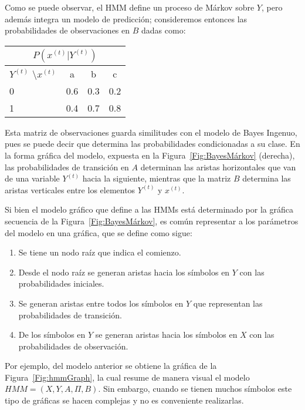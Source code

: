 Como se puede observar, el HMM define un proceso de Márkov sobre $Y$, pero además integra un modelo de predicción; consideremos entonces las probabilidades de observaciones en $B$ dadas como:

\begin{center}
 \begin{tabular}{l|ccc}
  \multicolumn{4}{c}{$P(x^{(t)}|Y^{(t)})$} \\ \hline
  $Y^{(t)}$ \textbackslash $x^{(t)}$          & a & b & c \\ \hline
  0 &    0.6   &    0.3  & 0.2 \\
  1   &    0.4   &    0.7  & 0.8 
 \end{tabular}
 \end{center}

 Esta matriz de observaciones guarda similitudes con el modelo de Bayes Ingenuo, pues se puede decir que determina las probabilidades condicionadas a su clase. En la forma gráfica del modelo, expuesta en la Figura~\ref{Fig:BayesMárkov} (derecha), las probabilidades de transición en $A$ determinan las aristas horizontales que van de una variable $Y^{(t)}$ hacia la siguiente, mientras que la matriz $B$ determina las aristas verticales entre los elementos $Y^{(t)}$ y $x^{(t)}$.

 Si bien el modelo gráfico que define a las HMMs está determinado por la gráfica secuencia de la Figura~\ref{Fig:BayesMárkov}, es común representar a los parámetros del modelo en una gráfica, que se define como sigue:

 \begin{enumerate}
     \item Se tiene un nodo raíz que indica el comienzo.
     \item Desde el nodo raíz se generan aristas hacia los símbolos en $Y$ con las probabilidades iniciales.
     \item Se generan aristas entre todos los símbolos en $Y$ que representan las probabilidades de transición.
     \item De los símbolos en $Y$ se generan aristas hacia los símbolos en $X$ con las probabilidades de observación.
 \end{enumerate}

 Por ejemplo, del modelo anterior se obtiene la gráfica de la Figura~\ref{Fig:hmmGraph}, la cual resume de manera visual el modelo $HMM = (X,Y, A,\Pi, B)$. Sin embargo, cuando se tienen muchos símbolos este tipo de gráficas se hacen complejas y no es conveniente realizarlas.


